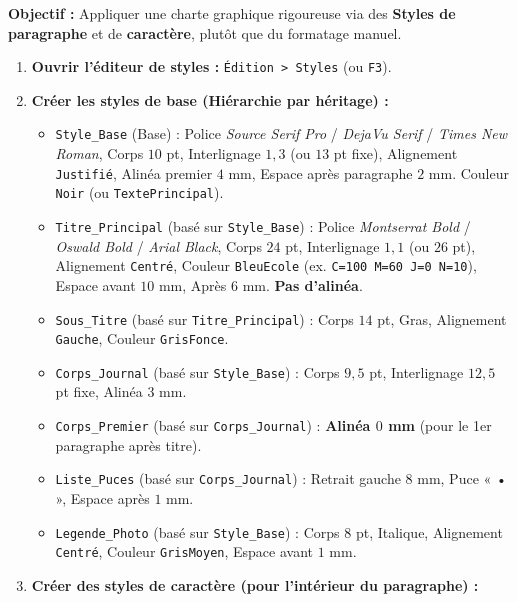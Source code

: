 \documentclass[11pt]{article}
\begin{document}
\begin{methode}
    \textbf{Objectif :} Appliquer une charte graphique rigoureuse via des \textbf{Styles de paragraphe} et de \textbf{caractère}, plutôt que du formatage manuel.
    \begin{enumerate}
        \item \textbf{Ouvrir l'éditeur de styles :} \texttt{Édition > Styles} (ou \texttt{F3}).
        \item \textbf{Créer les styles de base (Hiérarchie par héritage) :}
              \begin{itemize}
                  \item \texttt{Style\_Base} (Base) : Police \textit{Source Serif Pro} / \textit{DejaVu Serif} / \textit{Times New Roman}, Corps $10$ pt, Interlignage $1,3$ (ou $13$ pt fixe), Alignement \texttt{Justifié}, Alinéa premier $4$ mm, Espace après paragraphe $2$ mm. Couleur \texttt{Noir} (ou \texttt{TextePrincipal}).
                  \item \texttt{Titre\_Principal} (basé sur \texttt{Style\_Base}) : Police \textit{Montserrat Bold} / \textit{Oswald Bold} / \textit{Arial Black}, Corps $24$ pt, Interlignage $1,1$ (ou $26$ pt), Alignement \texttt{Centré}, Couleur \texttt{BleuEcole} (ex. \texttt{C=100 M=60 J=0 N=10}), Espace avant $10$ mm, Après $6$ mm. \textbf{Pas d'alinéa}.
                  \item \texttt{Sous\_Titre} (basé sur \texttt{Titre\_Principal}) : Corps $14$ pt, Gras, Alignement \texttt{Gauche}, Couleur \texttt{GrisFonce}.
                  \item \texttt{Corps\_Journal} (basé sur \texttt{Style\_Base}) : Corps $9,5$ pt, Interlignage $12,5$ pt fixe, Alinéa $3$ mm.
                  \item \texttt{Corps\_Premier} (basé sur \texttt{Corps\_Journal}) : \textbf{Alinéa $0$ mm} (pour le 1er paragraphe après titre).
                  \item \texttt{Liste\_Puces} (basé sur \texttt{Corps\_Journal}) : Retrait gauche $8$ mm, Puce « • », Espace après $1$ mm.
                  \item \texttt{Legende\_Photo} (basé sur \texttt{Style\_Base}) : Corps $8$ pt, Italique, Alignement \texttt{Centré}, Couleur \texttt{GrisMoyen}, Espace avant $1$ mm.
              \end{itemize}
        \item \textbf{Créer des styles de caractère (pour l'intérieur du paragraphe) :}

\end{enumerate}
\end{methode}
\end{document}
